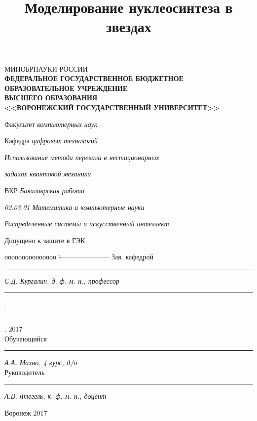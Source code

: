 \documentclass[14pt, a4paper]{article}
\numberwithin{figure}{section}
\numberwithin{equation}{section}
\begin{document}
	{\sffamily
		
		\begin{titlepage}
			
			\thispagestyle{empty}
			
			\center
			
			{\small МИНОБРНАУКИ РОССИИ}\\  \!  \!  \!
			{\footnotesize \textbf{ФЕДЕРАЛЬНОЕ ГОСУДАРСТВЕННОЕ БЮДЖЕТНОЕ ОБРАЗОВАТЕЛЬНОЕ УЧРЕЖДЕНИЕ}}\\ \!  \!  \!
			{\footnotesize  \textbf{ВЫСШЕГО ОБРАЗОВАНИЯ}}\\ \!  \!
			{\small \textbf{<<ВОРОНЕЖСКИЙ ГОСУДАРСТВЕННЫЙ УНИВЕРСИТЕТ>>}}\\ \!  \!
			
			\vspace{0.3cm}
			
			{\small
				
				\centerline{Факультет \emph{компьютерных наук}}
				\vspace{0.3cm}
				\centerline{Кафедра \emph{цифровых технологий}}
				
				\vspace{1cm}
				\vspace{1cm}
				
				\centerline{\emph{Использование метода перевала в нестационарных }}
				\centerline{\emph{задачах квантовой механики}}
				
				
				\centerline{ВКР \emph{Бакалаврская работа}}
				\centerline{\emph{02.03.01 Математика и компьютерные науки}}
				\centerline{\emph{Распределенные системы и искусственный интеллект}}
				
				\vfill
				\begin{flushleft}
					\raggedright{Допущено к защите в ГЭК}
				\end{flushleft}
				\begin{tabbing}
					ооооооооооооооо	\=	----------------------	\kill
					Зав. кафедрой	\> 	\rule[0mm]{2.5cm}{0,3mm}	\emph{С.Д. Кургалин, д. ф.-м. н., профессор } \rule[0mm]{5mm}{0,3mm} . \rule[0mm]{2.5mm}{0,3mm} . 2017\\
					Обучающийся 	\> 	\rule[0mm]{2.5cm}{0,3mm}	\emph{А.А. Махно, 4 курс, д/о}             \\
					Руководитель	\> 	\rule[0mm]{2.5cm}{0,3mm}  \emph{А.В. Флегель, к. ф.-м. н., доцент} \\
					
				\end{tabbing}
				
				\vfill
				
				\centerline{Воронеж 2017}
				
			}
			\clearpage
			
		\end{titlepage}
	}
\title{Моделирование нуклеосинтеза в звездах}
\tableofcontents
\end{document}
